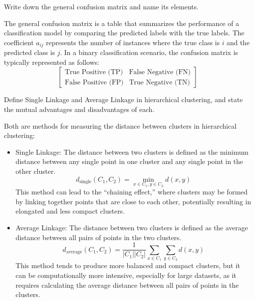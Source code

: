 \documentclass[12pt]{article}
\begin{document}
    \begin{ejercicio}
        Write down the general confusion matrix and name its elements.

        The general confusion matrix is a table that summarizes the performance of a classification model by comparing the predicted labels with the true labels. The coefficient $a_{ij}$ represents the number of instances where the true class is $i$ and the predicted class is $j$. In a binary classification scenario, the confusion matrix is typically represented as follows:
        \[
        \begin{bmatrix}
        \text{True Positive (TP)} & \text{False Negative (FN)} \\
        \text{False Positive (FP)} & \text{True Negative (TN)}
        \end{bmatrix}
        \]
    \end{ejercicio}

    \begin{ejercicio}
        Define Single Linkage and Average Linkage in hierarchical clustering, and state the mutual advantages and disadvantages of each.

        Both are methods for measuring the distance between clusters in hierarchical clustering:
        \begin{itemize}
            \item Single Linkage: The distance between two clusters is defined as the minimum distance between any single point in one cluster and any single point in the other cluster.
            \begin{equation*}
                d_{\text{single}}(C_1, C_2) = \min_{x \in C_1, y \in C_2} d(x, y)
            \end{equation*}
            This method can lead to the ``chaining effect,'' where clusters may be formed by linking together points that are close to each other, potentially resulting in elongated and less compact clusters.

            \item Average Linkage: The distance between two clusters is defined as the average distance between all pairs of points in the two clusters.
            \begin{equation*}
                d_{\text{average}}(C_1, C_2) = \frac{1}{|C_1||C_2|} \sum_{x \in C_1} \sum_{y \in C_2} d(x, y)
            \end{equation*}
            This method tends to produce more balanced and compact clusters, but it can be computationally more intensive, especially for large datasets, as it requires calculating the average distance between all pairs of points in the clusters.
        \end{itemize}
    \end{ejercicio}
\end{document}
